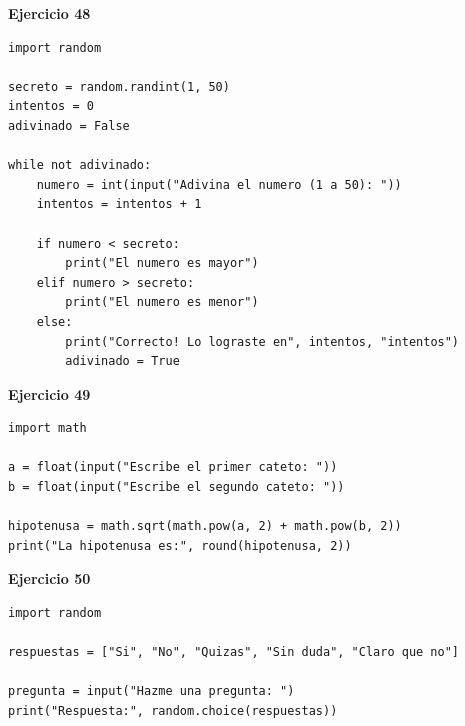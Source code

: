 \documentclass[12pt,a4paper]{article}
\begin{document}
\begin{cajaSolucion}
\textbf{Ejercicio 48}
\begin{lstlisting}[style=pythonStyle]
import random

secreto = random.randint(1, 50)
intentos = 0
adivinado = False

while not adivinado:
    numero = int(input("Adivina el numero (1 a 50): "))
    intentos = intentos + 1

    if numero < secreto:
        print("El numero es mayor")
    elif numero > secreto:
        print("El numero es menor")
    else:
        print("Correcto! Lo lograste en", intentos, "intentos")
        adivinado = True
\end{lstlisting}
\end{cajaSolucion}

\begin{cajaSolucion}
\textbf{Ejercicio 49}
\begin{lstlisting}[style=pythonStyle]
import math

a = float(input("Escribe el primer cateto: "))
b = float(input("Escribe el segundo cateto: "))

hipotenusa = math.sqrt(math.pow(a, 2) + math.pow(b, 2))
print("La hipotenusa es:", round(hipotenusa, 2))
\end{lstlisting}
\end{cajaSolucion}

\begin{cajaSolucion}
\textbf{Ejercicio 50}
\begin{lstlisting}[style=pythonStyle]
import random

respuestas = ["Si", "No", "Quizas", "Sin duda", "Claro que no"]

pregunta = input("Hazme una pregunta: ")
print("Respuesta:", random.choice(respuestas))
\end{lstlisting}
\end{cajaSolucion}
\end{document}
